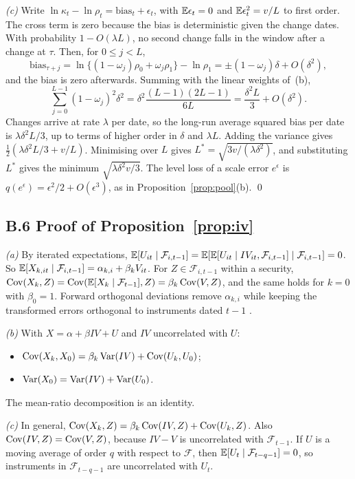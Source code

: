 \emph{(c)} Write $\ln\kappa_t-\ln\rho_t=\mathrm{bias}_t+\epsilon_t$, with $\mathbb{E}\epsilon_t=0$ and
$\mathbb{E}\epsilon_t^2=v/L$ to first order. The cross term is zero because the bias is deterministic
given the change dates. With probability $1-O(\lambda L)$, no second change falls in the window
after a change at $\tau$. Then, for $0\le j<L$,
\[
  \mathrm{bias}_{\tau+j}=\ln\{(1-\omega_j)\rho_0+\omega_j\rho_1\}-\ln\rho_1=\pm(1-\omega_j)\delta+O(\delta^2),
\]
and the bias is zero afterwards. Summing with the linear weights of~(b),
\[
  \sum_{j=0}^{L-1}(1-\omega_j)^2\delta^2=\delta^2\frac{(L-1)(2L-1)}{6L}=\frac{\delta^2L}{3}+O(\delta^2).
\]
Changes arrive at rate $\lambda$ per date, so the long-run average squared bias per date is
$\lambda\delta^2L/3$, up to terms of higher order in $\delta$ and $\lambda L$. Adding the variance
gives $\tfrac12(\lambda\delta^2L/3+v/L)$. Minimising over $L$ gives
$L^*=\sqrt{3v/(\lambda\delta^2)}$, and substituting $L^*$ gives the minimum
$\sqrt{\lambda\delta^2v/3}$. The level loss of a scale error $e^{\epsilon}$ is
$q(e^{\epsilon})=\epsilon^2/2+O(\epsilon^3)$, as in Proposition~\ref{prop:pool}(b). \qed

\subsection*{B.6 Proof of Proposition~\ref{prop:iv}}

\emph{(a)} By iterated expectations,
$\mathbb{E}[U_{it}\mid\mathcal F_{i,t-1}]=\mathbb{E}[\mathbb{E}[U_{it}\mid IV_{it},\mathcal F_{i,t-1}]\mid\mathcal F_{i,t-1}]=0$.
So $\mathbb{E}[X_{k,it}\mid\mathcal F_{i,t-1}]=\alpha_{k,i}+\beta_kV_{it}$. For $Z\in\mathcal F_{i,t-1}$
within a security, $\operatorname{Cov}(X_k,Z)=\operatorname{Cov}(\mathbb{E}[X_k\mid\mathcal F_{t-1}],Z)=\beta_k\operatorname{Cov}(V,Z)$, and the
same holds for $k=0$ with $\beta_0=1$. Forward orthogonal deviations remove $\alpha_{k,i}$ while
keeping the transformed errors orthogonal to instruments dated $t-1$ \citep{ArellanoBover1995}.

\emph{(b)} With $X=\alpha+\beta IV+U$ and $IV$ uncorrelated with $U$:
\begin{itemize}
  \item $\operatorname{Cov}(X_k,X_0)=\beta_k\operatorname{Var}(IV)+\operatorname{Cov}(U_k,U_0)$;
  \item $\operatorname{Var}(X_0)=\operatorname{Var}(IV)+\operatorname{Var}(U_0)$.
\end{itemize}
The mean-ratio decomposition is an identity.

\emph{(c)} In general, $\operatorname{Cov}(X_k,Z)=\beta_k\operatorname{Cov}(IV,Z)+\operatorname{Cov}(U_k,Z)$. Also
$\operatorname{Cov}(IV,Z)=\operatorname{Cov}(V,Z)$, because $IV-V$ is uncorrelated with $\mathcal F_{t-1}$. If $U$ is a moving
average of order $q$ with respect to $\mathcal F$, then $\mathbb{E}[U_t\mid\mathcal F_{t-q-1}]=0$, so
instruments in $\mathcal F_{t-q-1}$ are uncorrelated with $U_t$.

